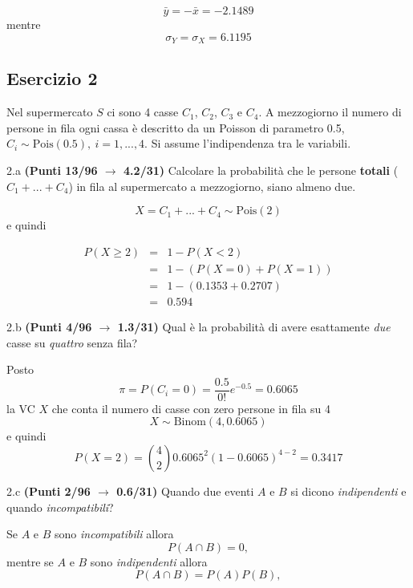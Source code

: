 \documentclass[
  11pt,
]{book}
\theoremstyle{mytheoremstyle}
\theoremstyle{mydefstyle}
\newenvironment{sol}
  {
  \begin{tcolorbox}[enhanced,breakable,arc=0.1mm,boxrule=1pt,colback=white,colframe=iblue,
  title=\bf \fontfamily{lmss}\selectfont \hspace{.5 cm} Soluzione,drop fuzzy shadow]

}{
\end{tcolorbox}
  }
\begin{document}
\begin{sol}
\[
\bar y=-\bar x=-2.1489
\]
mentre
\[
\sigma_Y=\sigma_X=6.1195
\]

\end{sol}

\subsection{Esercizio 2}\label{esercizio-2-3}

Nel supermercato \(S\) ci sono 4 casse \(C_1\), \(C_2\), \(C_3\) e \(C_4\). A mezzogiorno il numero di persone in fila ogni cassa è descritto da un Poisson di parametro 0.5, \(C_i\sim\text{Pois}(0.5),~i=1,...,4\). Si assume l'indipendenza tra le variabili.

2.a \textbf{(Punti 13/96 \(\rightarrow\) 4.2/31)} Calcolare la probabilità che le persone \textbf{totali} (\(C_1+...+C_4\)) in fila al supermercato a mezzogiorno, siano almeno due.

\begin{sol}
\[
X=C_1+...+C_4\sim \text{Pois}(2)
\]
e quindi

\begin{eqnarray*}
P(X\ge 2)&=&1-P(X< 2)\\
&=&1-(P(X=0)+P(X=1))\\
&=&1-(0.1353+0.2707)\\
&=&0.594
\end{eqnarray*}

\end{sol}

2.b \textbf{(Punti 4/96 \(\rightarrow\) 1.3/31)} Qual è la probabilità di avere esattamente \emph{due} casse su \emph{quattro} senza fila?

\begin{sol}
Posto
\[
\pi = P(C_i=0)=\frac {0.5}{0!}e^{-0.5}=0.6065
\]
la VC \(X\) che conta il numero di casse con zero persone in fila su 4
\[
X\sim\text{Binom}(4,0.6065)
\]
e quindi
\[
P(X=2)=\binom{4}{2}0.6065^2(1-0.6065)^{4-2}=0.3417
\]

\end{sol}

2.c \textbf{(Punti 2/96 \(\rightarrow\) 0.6/31)} Quando due eventi \(A\) e \(B\) si dicono \emph{indipendenti} e quando \emph{incompatibili}?

\begin{sol}
Se \(A\) e \(B\) sono \emph{incompatibili} allora
\[
P(A\cap B)=0,
\]
mentre se \(A\) e \(B\) sono \emph{indipendenti} allora
\[
P(A\cap B)=P(A)P(B),
\]

\end{sol}
\end{document}
